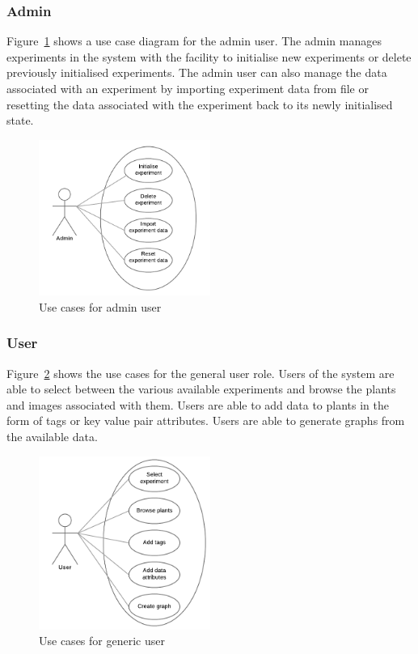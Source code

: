 \subsubsection{Admin}

Figure~\ref{fig:admin_case} shows a use case diagram for the admin user. The admin manages experiments in the system with the facility to initialise new experiments or delete previously initialised experiments. The admin user can also manage the data associated with an experiment by importing experiment data from file or resetting the data associated with the experiment back to its newly initialised state.

\begin{figure}[H]
    \centering
    \includegraphics[width=0.5\textwidth]{images/analysis/admin_case}
    \caption{Use cases for admin user}
    \label{fig:admin_case}
\end{figure}

\subsubsection{User}

Figure~\ref{fig:user_case} shows the use cases for the general user role. Users of the system are able to select between the various available experiments and browse the plants and images associated with them. Users are able to add data to plants in the form of tags or key value pair attributes. Users are able to generate graphs from the available data.

\begin{figure}[H]
    \centering
    \includegraphics[width=0.5\textwidth]{images/analysis/user_case}
    \caption{Use cases for generic user}
    \label{fig:user_case}
\end{figure}

